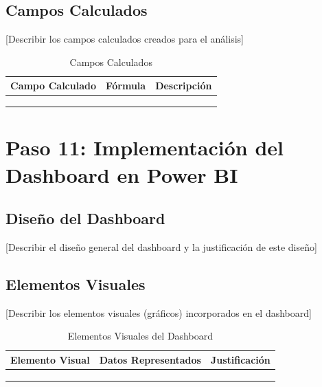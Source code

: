 \documentclass[12pt,letterpaper]{report}
\begin{document}
\subsection{Campos Calculados}
[Describir los campos calculados creados para el análisis]

\begin{table}[H]
    \centering
    \begin{tabularx}{\textwidth}{|X|X|X|}
        \hline
        \textbf{Campo Calculado} & \textbf{Fórmula} & \textbf{Descripción} \\
        \hline
        & & \\
        \hline
        & & \\
        \hline
        & & \\
        \hline
    \end{tabularx}
    \caption{Campos Calculados}
\end{table}

\section{Paso 11: Implementación del Dashboard en Power BI}

\subsection{Diseño del Dashboard}
[Describir el diseño general del dashboard y la justificación de este diseño]

\subsection{Elementos Visuales}
[Describir los elementos visuales (gráficos) incorporados en el dashboard]

\begin{table}[H]
    \centering
    \begin{tabularx}{\textwidth}{|X|X|X|}
        \hline
        \textbf{Elemento Visual} & \textbf{Datos Representados} & \textbf{Justificación} \\
        \hline
        & & \\
        \hline
        & & \\
        \hline
        & & \\
        \hline
    \end{tabularx}
    \caption{Elementos Visuales del Dashboard}
\end{table}
\end{document}
